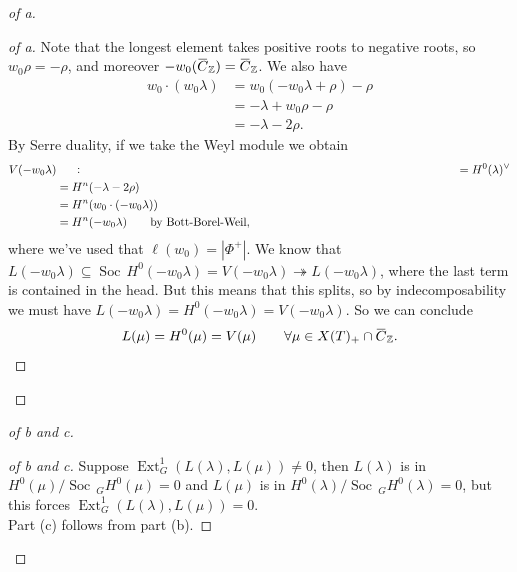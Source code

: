 \begin{proof}[of a]

\begin{proof}[of a]

Note that the longest element takes positive roots to negative roots, so
\(w_0 \rho = - \rho\), and moreover
\(-w_0(\mkern 1.5mu\overline{\mkern-1.5muC\mkern-1.5mu}\mkern 1.5mu_{\mathbb{Z}}) = \mkern 1.5mu\overline{\mkern-1.5muC\mkern-1.5mu}\mkern 1.5mu_{\mathbb{Z}}\).
We also have
\begin{align*} w_0 \cdot ( w_0 \lambda)  &= w_0 (-w_0 \lambda + \rho) - \rho \\ &= -\lambda + w_0 \rho - \rho \\ &= -\lambda - 2\rho .\end{align*}
By Serre duality, if we take the Weyl module we obtain
\begin{align*} V(-w_0 \lambda)  &\mathrel{\vcenter{:}}= H^0(\lambda)^\vee\\ &= H^n(-\lambda - 2\rho) \\ &= H^n(w_0 \cdot (-w_0 \lambda)) \\ &= H^n(-w_0 \lambda) \qquad\text{by Bott-Borel-Weil} ,\end{align*}
where we've used that
\(\ell(w_0) = {\left\lvert {\Phi^+} \right\rvert}\). We know that
\(L(-w_0 \lambda) \subseteq \operatorname{Soc}\,H^0(-w_0 \lambda) = V(-w_0 \lambda) \twoheadrightarrow L(-w_0 \lambda)\),
where the last term is contained in the head. But this means that this
splits, so by indecomposability we must have
\(L(-w_0 \lambda) = H^0(-w_0 \lambda) = V(-w_0 \lambda)\). So we can
conclude
\begin{align*}   L(\mu) = H^0(\mu) = V(\mu) \qquad \forall \mu \in X(T)_+ \cap\mkern 1.5mu\overline{\mkern-1.5muC\mkern-1.5mu}\mkern 1.5mu_{\mathbb{Z}} .\end{align*}

\end{proof}

\end{proof}

\begin{proof}[of b and c]

\begin{proof}[of b and c]

Suppose \(\operatorname{Ext}_G^1(L(\lambda), L(\mu)) \neq 0\), then
\(L(\lambda)\) is in \(H^0(\mu) / \operatorname{Soc}\,_G H^0(\mu) = 0\)
and \(L(\mu)\) is in
\(H^0(\lambda) / \operatorname{Soc}\,_G H^0(\lambda) = 0\), but this
forces \(\operatorname{Ext}_G^1(L(\lambda), L(\mu)) = 0\).\\

Part (c) follows from part (b).

\end{proof}

\end{proof}

